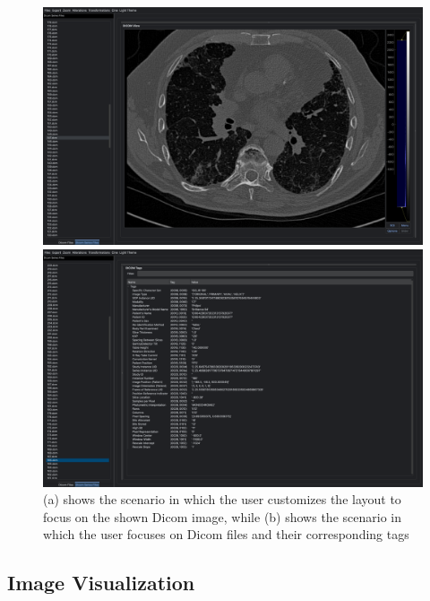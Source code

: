 \documentclass[conference]{IEEEtran}
\begin{document}
 \begin{figure}[h]
    \begin{minipage}{.49\columnwidth}
        \includegraphics[width=\columnwidth]{image focus.png}
        \subcaption{}
    \end{minipage}\hfill
    \begin{minipage}{.49\columnwidth}
        \includegraphics[width=\columnwidth]
        {tags focus.png}
        \subcaption{}
    \end{minipage}
    \caption{\tiny (a) shows the scenario in which the user customizes the layout to focus on the shown Dicom image, while (b) shows the scenario in which the user focuses on Dicom files and their corresponding tags}
\end{figure}

\subsection{Image Visualization}
\end{document}
